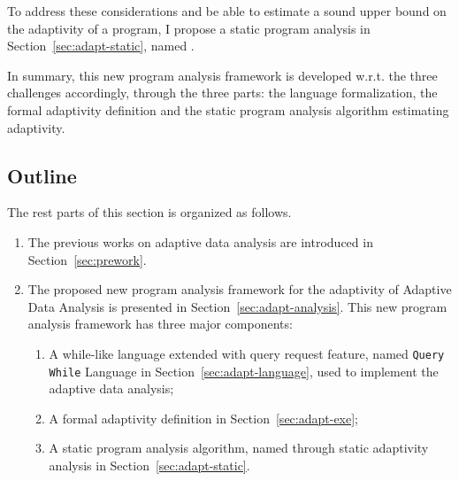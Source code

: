 \begin{enumerate}
To address these considerations and be able to estimate a sound upper bound on the adaptivity of a program, 
I propose a static program analysis in Section~\ref{sec:adapt-static}, named {\THESYSTEM}.
\end{enumerate}

In summary, this new program analysis framework is
developed w.r.t. the three challenges accordingly,
through the three parts:
the language formalization,
the formal adaptivity definition and the static program analysis algorithm estimating adaptivity.


\subsection{Outline}
\label{sec:adapt-outline}
The rest parts of this section is organized as follows. 
\begin{enumerate}
   \item The previous works on adaptive data analysis are introduced in Section~\ref{sec:prework}.
   \item The proposed new program analysis framework for the adaptivity of Adaptive Data Analysis is presented 
   in Section~\ref{sec:adapt-analysis}.
   This new program analysis framework has three major components:
   \begin{enumerate}
      \item A while-like language extended with query request feature, named {\tt Query While} Language  in Section~\ref{sec:adapt-language}, 
      used to implement the adaptive data analysis;
      \item A formal adaptivity definition in Section~\ref{sec:adapt-exe};
      \item A static program analysis algorithm, named {\THESYSTEM} through static adaptivity analysis in Section~\ref{sec:adapt-static}.
   \end{enumerate}
\end{enumerate}